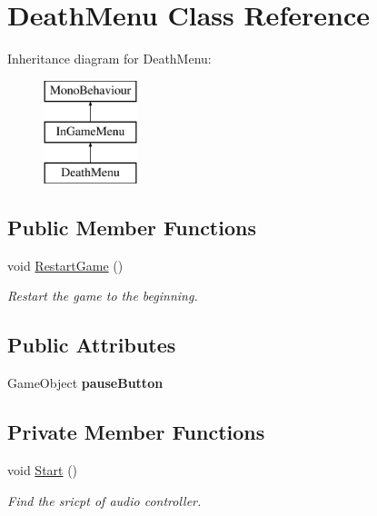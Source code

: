 \hypertarget{class_death_menu}{}\section{Death\+Menu Class Reference}
\label{class_death_menu}
Inheritance diagram for Death\+Menu\+:\begin{figure}[H]
\begin{center}
\leavevmode
\includegraphics[height=3.000000cm]{class_death_menu}
\end{center}
\end{figure}
\subsection*{Public Member Functions}
\begin{DoxyCompactItemize}
\item 
void \hyperlink{class_death_menu_a331f0bc408bd7621fe89bb0950c40997}{Restart\+Game} ()
\begin{DoxyCompactList}\small\item\em Restart the game to the beginning. \end{DoxyCompactList}\end{DoxyCompactItemize}
\subsection*{Public Attributes}
\begin{DoxyCompactItemize}
\item 
\hypertarget{class_death_menu_af0dfdc84c700a9e6264e588990b2239b}{}\label{class_death_menu_af0dfdc84c700a9e6264e588990b2239b} 
Game\+Object {\bfseries pause\+Button}
\end{DoxyCompactItemize}
\subsection*{Private Member Functions}
\begin{DoxyCompactItemize}
\item 
void \hyperlink{class_death_menu_a635010b99915f887ed7809f5c2e2a655}{Start} ()
\begin{DoxyCompactList}\small\item\em Find the sricpt of audio controller. \end{DoxyCompactList}\end{DoxyCompactItemize}
